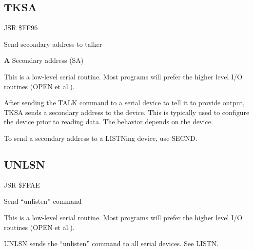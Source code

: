 \subsection{TKSA}
\label{KERNAL Jump Table!TKSA}
\begin{description}[leftmargin=2cm,style=nextline]
    \item [Address:] JSR \$FF96
    \item [Description:] Send secondary address to talker
    \item [Inputs:]
        \textbf{A} Secondary address (SA)
    \item [Remarks:]
        This is a low-level serial routine. Most programs will prefer the higher level I/O routines (OPEN et al.).

        After sending the TALK command to a serial device to tell it to provide output, TKSA sends a secondary address to the device. This is typically used to configure the device prior to reading data. The behavior depends on the device.

        To send a secondary address to a LISTNing device, use SECND.
    \item [Example:]
\end{description}



\newpage
\subsection{UNLSN}
\label{KERNAL Jump Table!UNLSN}
\begin{description}[leftmargin=2cm,style=nextline]
    \item [Address:] JSR \$FFAE
    \item [Description:] Send ``unlisten'' command
    \item [Remarks:]
        This is a low-level serial routine. Most programs will prefer the higher level I/O routines (OPEN et al.).

        UNLSN sends the ``unlisten'' command to all serial devices. See LISTN.
    \item [Example:]
\end{description}


